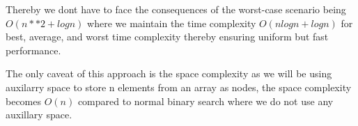 \documentclass{article}
\begin{document}
\begin{enumerate}
\begin{enumerate}[label*=\arabic*.]
        Thereby we dont have to face the consequences of the worst-case scenario being \( O(n**2 + logn) \) where we maintain the time complexity \( O(nlogn + logn) \) for best, average, and worst time complexity thereby ensuring uniform but fast performance. 

        The only caveat of this approach is the space complexity as we will be using auxilarry space to store n elements from an array as nodes, the space complexity becomes \( O(n) \) compared to normal binary search where we do not use any auxillary space. 

    \end{enumerate}
\end{enumerate}
\end{document}
